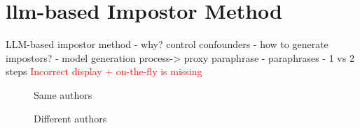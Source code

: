 \chapter{\acs{llm}-based Impostor Method}
\label{chap:llm_impostor_method}
    LLM-based impostor method
    - why? control confounders
    - how to generate impostors? 
        - model generation process-> proxy paraphrase
        - paraphrases
        - 1 vs 2 steps
\textcolor{red}{Incorrect display + on-the-fly is missing}
\begin{figure}[htbp]
  \centering
  \begin{subfigure}[b]{0.45\textwidth}
    \centering
    
    \caption{\dataBlog{}}
    \label{fig:blog_same_author}
  \end{subfigure}
  \hfill
  \begin{subfigure}[b]{0.45\textwidth}
    \centering
    
    \caption{\dataStudent{}}
    \label{fig:student_essays_same_author}
  \end{subfigure}
  \caption{Same authors}
  \label{fig:same_authors}
\end{figure}


\begin{figure}[htbp]
  \centering
  \begin{subfigure}[b]{0.45\textwidth}
    \centering
    
    \caption{\dataBlog{}}
    \label{fig:blog_different_author}
  \end{subfigure}
  \hfill
  \begin{subfigure}[b]{0.45\textwidth}
    \centering
    
    \caption{\dataStudent{}}
    \label{fig:student_essays_different_author}
  \end{subfigure}
  \caption{Different authors}
  \label{fig:different_authors}
\end{figure}

